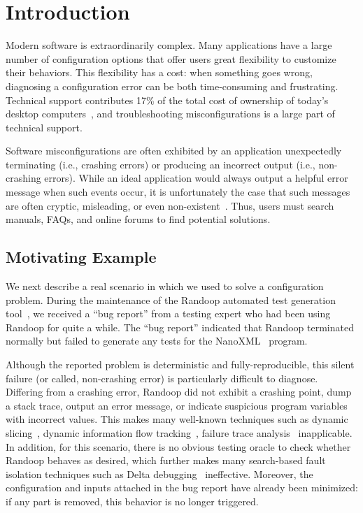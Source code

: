 
\section{Introduction}
\label{sec:introduction}

Modern software is extraordinarily complex. Many applications have a large
number of configuration options that offer users great flexibility to
customize their behaviors. This flexibility has a cost: when something
goes wrong, diagnosing a configuration error can be both time-consuming
and frustrating. Technical support contributes 17\% of the total cost of ownership of
today's desktop computers~\cite{confevidence}, and troubleshooting misconfigurations
is a large part of technical support.

Software misconfigurations are often exhibited by an application unexpectedly terminating
(i.e., crashing errors) or producing an incorrect output (i.e., non-crashing errors). While an ideal application would always
output a helpful error message when such events occur, it is unfortunately
the case that such messages are often cryptic, misleading, or
even non-existent~\cite{Yin:2011:ESC, Attariyan:2010:ACT, Hubaux:2012, rangefix}.
Thus, users must search manuals, FAQs, and online forums to find potential
solutions.%

\subsection{Motivating Example}
\label{sec:mot}

We next describe a real scenario in which we used \ourtool to solve a configuration problem. 
During the maintenance of the Randoop
automated test generation tool~\cite{randoop}, we received a ``bug report''
from a testing expert who had been using Randoop for quite a while.
The ``bug report'' indicated that Randoop terminated normally but
failed to generate any tests for the NanoXML~\cite{nanoxml} program. 

Although the reported problem is deterministic and fully-reproducible,
this silent failure (or called, non-crashing error) is
particularly difficult to diagnose. Differing from
a crashing error, Randoop did not exhibit a crashing point, dump
 a stack trace, output an error message, or indicate suspicious program variables
with incorrect values. This makes many well-known
techniques such as dynamic slicing~\cite{Zhang:2003:PDS},
dynamic information flow tracking~\cite{Attariyan:2010:ACT},
failure trace analysis~\cite{Rabkin:2011:PPC} inapplicable.
In addition, for this scenario, there is no obvious testing oracle to check whether
Randoop behaves as desired, which further makes many
search-based fault isolation techniques such as Delta debugging~\cite{Zeller:2002:ICC}
ineffective. Moreover, the configuration and
inputs attached in the bug report have already been
minimized: if any part is removed, this behavior
is no longer triggered. 

